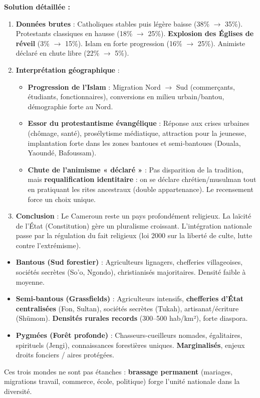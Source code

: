 \documentclass[11pt]{article}
\begin{document}
\begin{exoresolu}
\textbf{Solution détaillée :}
\begin{enumerate}
    \item \textbf{Données brutes} : Catholiques stables puis légère baisse (38\% $\rightarrow$ 35\%). Protestants classiques en hausse (18\% $\rightarrow$ 25\%). \textbf{Explosion des Églises de réveil} (3\% $\rightarrow$ 15\%). Islam en forte progression (16\% $\rightarrow$ 25\%). Animiste déclaré en chute libre (22\% $\rightarrow$ 5\%).
    \item \textbf{Interprétation géographique} : 
    \begin{itemize}
        \item \textbf{Progression de l'Islam} : Migration Nord $\rightarrow$ Sud (commerçants, étudiants, fonctionnaires), conversions en milieu urbain/bantou, démographie forte au Nord.
        \item \textbf{Essor du protestantisme évangélique} : Réponse aux crises urbaines (chômage, santé), prosélytisme médiatique, attraction pour la jeunesse, implantation forte dans les zones bantoues et semi-bantoues (Douala, Yaoundé, Bafoussam).
        \item \textbf{Chute de l'animisme « déclaré »} : Pas disparition de la tradition, mais \textbf{requalification identitaire} : on se déclare chrétien/musulman tout en pratiquant les rites ancestraux (double appartenance). Le recensement force un choix unique.
    \end{itemize}
    \item \textbf{Conclusion} : Le Cameroun reste un pays profondément religieux. La laïcité de l'État (Constitution) gère un pluralisme croissant. L'intégration nationale passe par la régulation du fait religieux (loi 2000 sur la liberté de culte, lutte contre l'extrémisme).
\end{enumerate}
\end{exoresolu}

\begin{aretenir}
\begin{itemize}
    \item \textbf{Bantous (Sud forestier)} : Agriculteurs lignagers, chefferies villageoises, sociétés secrètes (So'o, Ngondo), christianisés majoritaires. Densité faible à moyenne.
    \item \textbf{Semi-bantous (Grassfields)} : Agriculteurs intensifs, \textbf{chefferies d'État centralisées} (Fon, Sultan), sociétés secrètes (Tukah), artisanat/écriture (Shümom). \textbf{Densités rurales records} (\num{300}--\num{500} hab/km²), forte diaspora.
    \item \textbf{Pygmées (Forêt profonde)} : Chasseurs-cueilleurs nomades, égalitaires, spirituels (Jengi), connaissances forestières uniques. \textbf{Marginalisés}, enjeux droits fonciers / aires protégées.
\end{itemize}
Ces trois mondes ne sont pas étanches : \textbf{brassage permanent} (mariages, migrations travail, commerce, école, politique) forge l'unité nationale dans la diversité.
\end{aretenir}
\end{document}
